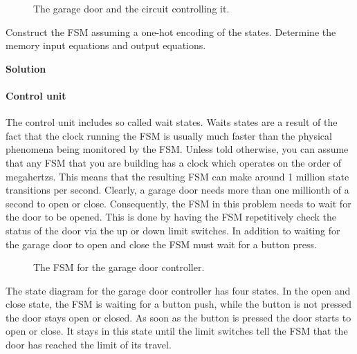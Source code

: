 \begin{enumerate}
        \begin{figure}[ht]
            \caption{The garage door and the circuit controlling it.}
            \label{fig:hwgarage}
        \end{figure}

        Construct the FSM assuming a one-hot encoding of the states.
        Determine the memory input equations and output equations.

        \begin{onlysolution}  \textbf{Solution} \itshape{

                \paragraph{Control unit}
                The control unit includes so called wait states.  Waits states are
                a result of the fact that the clock running the FSM is usually
                much faster than the physical phenomena being monitored by the FSM.
                Unless told otherwise, you can assume that any FSM that you are
                building has a clock which operates on the order of megahertzs.
                This means that the resulting FSM can make around 1 million
                state transitions per second.  Clearly, a garage door needs more
                than one millionth of a second to open or close.  Consequently,
                the FSM in this problem needs to wait for the door to be opened.
                This is done by having the FSM repetitively check the status of the
                door via the up or down limit switches.  In addition to waiting
                for the garage door to open and close the FSM must wait for a
                button press.

                \begin{figure}[ht]
                    \caption{The FSM for the garage door controller.}
                \end{figure}

                The state diagram for the garage door controller has four states.
                In the open and close state, the FSM is waiting for a button push,
                while the button is not pressed the door stays open or closed.  As
                soon as the button is pressed the door starts to open or close.
                It stays in this state until the limit switches tell the FSM that
                the door has reached the limit of its travel.

}
\end{onlysolution}
\end{enumerate}
